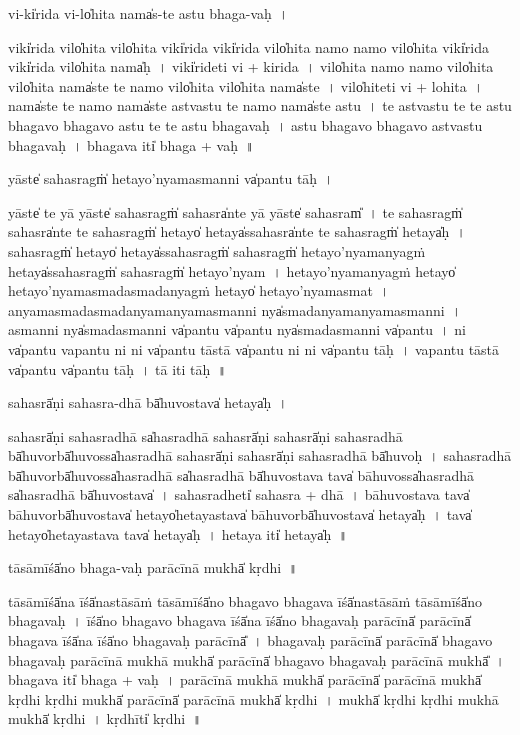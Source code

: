 \documentclass[parskip, DIV=14]{scrartcl}
\begin{document}
{vi-ki̍rida॒ vi-lo̍hita॒ nama̍s-te astu bhaga-vaḥ~।

viki̍rida॒ vilo̍hita॒ vilo̍hita॒ viki̍rida॒ viki̍rida॒ vilo̍hita॒ namo॒ namo॒ vilo̍hita॒ viki̍rida॒ viki̍rida॒ vilo̍hita॒ nama̍ḥ~।
viki̍ri॒deti॒ vi + ki॒ri॒da॒~। 
vilo̍hita॒ namo॒ namo॒ vilo̍hita॒ vilo̍hita॒ nama̍ste te॒ namo॒ vilo̍hita॒ vilo̍hita॒ nama̍ste~।
vilo̍hi॒teti॒ vi + lo॒hi॒ta॒~।
nama̍ste te॒ namo॒ nama̍ste astvastu te॒ namo॒ nama̍ste astu~।
te॒ a॒stva॒stu॒ te॒ te॒ a॒stu॒ bha॒ga॒vo॒ bha॒ga॒vo॒ a॒stu॒ te॒ te॒ a॒stu॒ bha॒ga॒va॒ḥ॒~।
a॒stu॒ bha॒ga॒vo॒ bha॒ga॒vo॒ a॒stva॒stu॒ bha॒ga॒va॒ḥ॒~।
bha॒ga॒va॒ iti̍ bhaga + va॒ḥ॒~॥ 

yāste̍ sa॒hasragṁ̍ he॒tayo॒'nyama॒smanni va̍pantu॒ tāḥ~।


yāste̍ te॒ yā yāste̍ sa॒hasragṁ̍ sa॒hasra̍nte॒ yā yāste̍ sa॒hasram̎~।
te॒ sa॒hasragṁ̍ sa॒hasra̍nte te sa॒hasragṁ̍ he॒tayo̍ he॒taya̍ssa॒hasra̍nte te sa॒hasragṁ̍ he॒taya̍ḥ~।
sa॒hasragṁ̍ he॒tayo̍ he॒taya̍ssa॒hasragṁ̍ sa॒hasragṁ̍ he॒tayo॒'nyama॒nyagṁ he॒taya̍ssa॒hasragṁ̍ sa॒hasragṁ̍ he॒tayo॒'nyam~।
he॒tayo॒'nyama॒nyagṁ he॒tayo̍ he॒tayo॒'nyama॒smada॒smada॒nyagṁ he॒tayo̍ he॒tayo॒'nyama॒smat~। %
a॒nyama॒smada॒smada॒nyama॒nyama॒smanni nya̍smada॒nyama॒nyama॒smanni~।
a॒smanni nya̍smada॒smanni va̍pantu va̍pantu॒ nya̍smada॒smanni va̍pantu~।
ni va̍pantu vapantu॒ ni ni va̍pantu॒ tāstā va̍pantu॒ ni ni va̍pantu॒ tāḥ~। %
va॒pa॒ntu॒ tāstā va̍pantu va̍pantu॒ tāḥ~।
tā iti॒ tāḥ~॥ 

sa॒hasrā̍ṇi sahasra॒-dhā bā̍hu॒vostava̍ he॒taya̍ḥ~।

sa॒hasrā̍ṇi sahasra॒dhā sa̍hasra॒dhā sa॒hasrā̍ṇi sa॒hasrā̍ṇi sahasra॒dhā bā̍hu॒vorbā̍hu॒vossa̍hasra॒dhā sa॒hasrā̍ṇi sa॒hasrā̍ṇi sahasra॒dhā bā̍hu॒voḥ~।
sa॒ha॒sra॒dhā bā̍hu॒vorbā̍hu॒vossa̍hasra॒dhā sa̍hasra॒dhā bā̍hu॒vostava॒ tava̍ bāhu॒vossa̍hasra॒dhā sa̍hasra॒dhā bā̍hu॒vostava̍~।
sa॒ha॒sra॒dheti̍ sahasra + dhā~।
bā॒hu॒vostava॒ tava̍ bāhu॒vorbā̍hu॒vostava̍ he॒tayo̍he॒taya॒stava̍ bāhu॒vorbā̍hu॒vostava̍ he॒taya̍ḥ~।
tava̍ he॒tayo̍he॒taya॒stava॒  tava̍ he॒taya̍ḥ~।
he॒taya॒ iti̍ he॒taya̍ḥ~॥ 

tāsā॒mīśā̍no bhaga-vaḥ parā॒cīnā॒ mukhā̍ kṛdhi~॥ 

tāsā॒mīśā̍na॒ īśā̍na॒stāsā॒ṁ tāsā॒mīśā̍no bhagavo bhagava॒ īśā̍na॒stāsā॒ṁ tāsā॒mīśā̍no bhagavaḥ~।
īśā̍no bhagavo bhagava॒ īśā̍na॒ īśā̍no bhagavaḥ parā॒cīnā̍ parā॒cīnā̍ bhagava॒ īśā̍na॒ īśā̍no bhagavaḥ parā॒cīnā̎~।
bha॒ga॒va॒ḥ pa॒rā॒cīnā̍ parā॒cīnā̍ bhagavo bhagavaḥ parā॒cīnā॒ mukhā॒ mukhā̍ parā॒cīnā̍ bhagavo bhagavaḥ parā॒cīnā॒ mukhā̎~। %
bha॒ga॒va॒ iti̍ bhaga + va॒ḥ॒~।
pa॒rā॒cīnā॒ mukhā॒ mukhā̍ parā॒cīnā̍ parā॒cīnā॒ mukhā̍ kṛdhi kṛdhi॒ mukhā̍ parā॒cīnā̍ parā॒cīnā॒ mukhā̍ kṛdhi~। %
mukhā̍ kṛdhi kṛdhi॒ mukhā॒ mukhā̍ kṛdhi~। %
kṛdhīti̍ kṛdhi~॥ 

}
\end{document}
